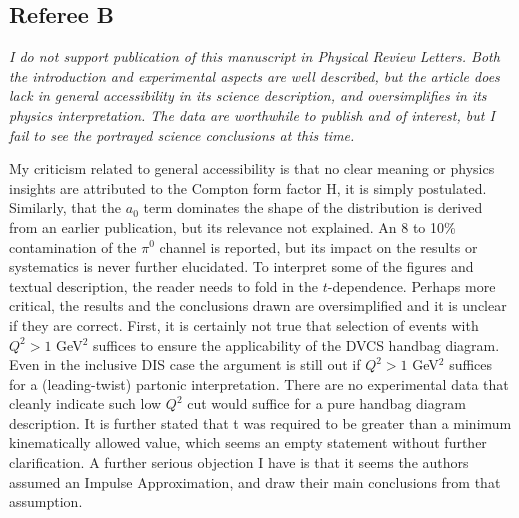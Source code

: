 \documentclass{article}
\begin{document}
\subsection{Referee B}

{\em I do not support publication of this manuscript in Physical Review Letters. Both the introduction and experimental aspects are well described, but the article does lack in general accessibility in its science description, and oversimplifies in its physics interpretation. The data are worthwhile to publish and of interest, but I fail to see the portrayed science conclusions at this time.

My criticism related to general accessibility is that no clear meaning or physics insights are attributed to the Compton form factor H, it is simply postulated. Similarly, that the $a_0$ term dominates the shape of the distribution is derived from an earlier publication, but its relevance not explained. An 8 to 10\% contamination of the $\pi^0$ channel is reported, but its impact on the results or systematics is never further elucidated. To interpret some of the figures and textual description, the reader needs to fold in the $t$-dependence. Perhaps more critical, the results and the conclusions drawn are oversimplified and it is unclear if they are correct. First, it is certainly not true that selection of events with $Q^2>1$  GeV$^2$ suffices to ensure the applicability of the DVCS handbag diagram. Even in the inclusive DIS case the argument is still out if $Q^2>1$ GeV$^2$ suffices for a (leading-twist) partonic interpretation. There are no experimental data that cleanly indicate such low $Q^2$ cut would suffice for a pure handbag diagram description. It is further stated that t was required to be greater than a minimum kinematically allowed value, which seems an empty statement without further clarification.  A further serious objection I have is that it seems the authors assumed an Impulse Approximation, and draw their main conclusions from that assumption.

}
\end{document}
